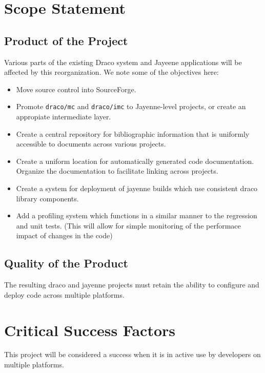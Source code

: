 \documentclass[11pt]{nmemo}
\begin{document}
\section*{Scope Statement}


\subsection*{Product of the Project}

Various parts of the existing Draco system and Jayeene applications
will be affected by this reorganization. We note some of the
objectives here:

\begin{itemize}
\item Move source control into SourceForge.
\item Promote {\tt draco/mc} and {\tt draco/imc} to Jayenne-level
  projects, or create an appropiate intermediate layer.
\item Create a central repository for bibliographic information that
  is uniformly accessible to documents across various projects.
\item Create a uniform location for automatically generated code
  documentation. Organize the documentation to facilitate linking
  across projects.
\item Create a system for deployment of jayenne builds which use
  consistent draco library components. 
\item Add a profiling system which functions in a similar manner to
  the regression and unit tests. (This will allow for simple
  monitoring of the performace impact of changes in the code)
\end{itemize}

\subsection*{Quality of the Product}

The resulting draco and jayenne projects must retain the ability to
configure and deploy code across multiple platforms. 

\newpage
\section*{Critical Success Factors}

This project will be considered a success when it is in active use by
developers on multiple platforms.
\end{document}
